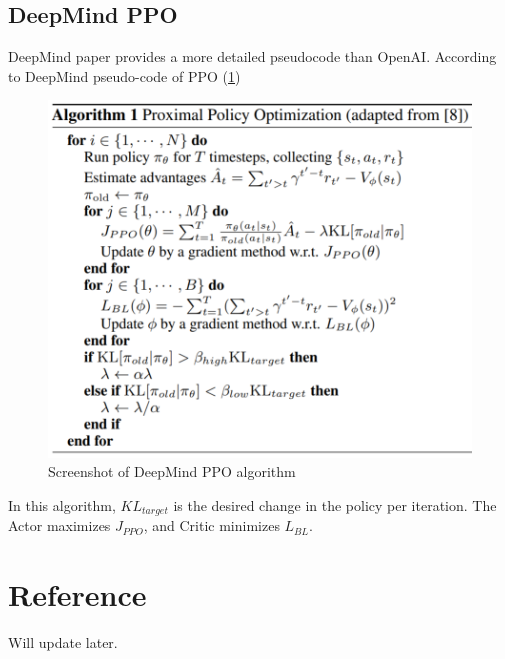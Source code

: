 \documentclass[lang=en,mode=normal,device=normal,color=blue,12pt]{elegantnote}
\DeclareMathOperator*{\1}{\mathbbm{1}}
\begin{document}
\newpage
\subsection{DeepMind PPO}

DeepMind paper provides a more detailed pseudocode than OpenAI. According to DeepMind pseudo-code of PPO (\ref{fig:ppo})

\begin{figure}[!ht]
  \centering
  \includegraphics[width=0.7\linewidth]{ppo.PNG}
  \caption{Screenshot of DeepMind PPO algorithm}
  \label{fig:ppo}
\end{figure}

In this algorithm, $KL_{target}$ is the desired change in the policy per iteration.
The Actor maximizes $J_{PPO}$, and Critic minimizes $L_{BL}$.

\section{Reference}
Will update later.


%
\end{document}
